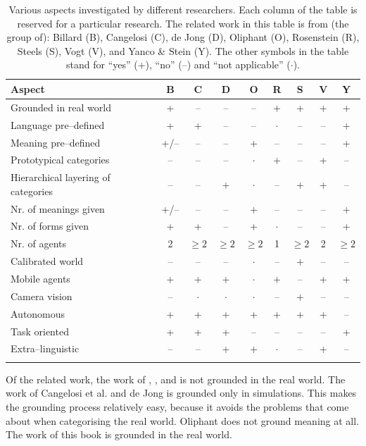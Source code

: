 \begin{table}[t]
\begin{tabular}{>{\raggedright}p{4cm}cccccccc}
\lsptoprule
Aspect & B & C & D & O & R & S & V & Y\\\midrule
Grounded in real world & + & -- & -- & -- & + & + & + & +\\\hline
Language pre--defined & + & + & -- & -- & $\cdot$ & -- & -- & +\\\hline
Meaning pre--defined & +/-- & -- & -- & + & -- & -- & -- & +\\\hline
Prototypical categories & -- & -- & -- & $\cdot$ & + & -- & + & --\\\hline
Hierarchical layering of categories & -- & -- & + & $\cdot$ & -- & + & + & --\\\hline
Nr. of meanings given & +/-- & -- & -- & + & -- & -- & -- & +\\\hline
Nr. of forms given & + & + & -- & + & $\cdot$ & -- & -- & +\\\hline
Nr. of agents & 2 & $\geq 2$ & $\geq 2$ & $\geq 2$ & 1 & $\geq 2$ & 2 & $\geq 2$\\\hline
Calibrated world & -- & -- & -- & $\cdot$ & -- & + & -- & --\\\hline
Mobile agents & + & + & + & $\cdot$ & + & -- & + & +\\\hline
Camera vision & -- & $\cdot$ & $\cdot$ & $\cdot$ & -- & + & -- & --\\\hline
Autonomous & + & + & + & + & + & + & + & --\\\hline
Task oriented & + & + & + & -- & -- & -- & -- & +\\\hline
Extra--linguistic & -- & -- & + & + & $\cdot$ & -- & + & --\\
\lspbottomrule
\end{tabular}
\caption{Various aspects investigated by different researchers. Each column of the table is reserved for a particular research. The related work in this table is from (the group of): Billard (B), Cangelosi (C), de Jong (D), Oliphant (O), Rosenstein (R), Steels (S), Vogt (V), and Yanco \& Stein (Y). The other symbols in the table stand for ``yes'' (+), ``no'' (--) and ``not applicable'' ($\cdot$).}
\label{t:intro:contrib}
\end{table}


Of the related work, the work of \citet{cangelosiparisi:1998}, \citet{dejong:2000}, and \citet{oliphant:1997} is not grounded in the real world. The work of Cangelosi et al. and de Jong is grounded only in simulations. This makes the grounding process relatively easy, because it avoids the problems that come about when categorising the real world. Oliphant does not ground meaning at all. The work of this book is grounded in the real world.

